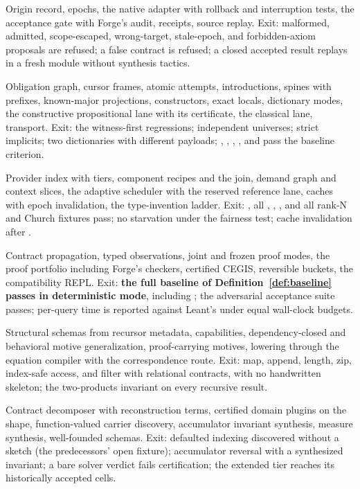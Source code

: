 \begin{description}[style=nextline]
\item[G0 Trusted path.] Origin record, epochs, the native adapter with rollback and interruption tests, the acceptance gate with Forge's audit, receipts, source replay. Exit: malformed, admitted, scope-escaped, wrong-target, stale-epoch, and forbidden-axiom proposals are refused; a false contract is refused; a closed accepted result replays in a fresh module without synthesis tactics.
\item[G1 Native core.] Obligation graph, cursor frames, atomic attempts, introductions, spines with prefixes, known-major projections, constructors, exact locals, dictionary modes, the constructive propositional lane with its certificate, the classical lane, transport. Exit: the witness-first regressions; independent universes; strict implicits; two dictionaries with different payloads; , , , , and  pass the baseline criterion.
\item[G2 Composition.] Provider index with tiers, component recipes and the join, demand graph and context slices, the adaptive scheduler with the reserved reference lane, caches with epoch invalidation, the type-invention ladder. Exit: , all , , , and all rank-N and Church fixtures pass; no starvation under the fairness test; cache invalidation after .
\item[G3 Baseline release.] Contract propagation, typed observations, joint and frozen proof modes, the proof portfolio including Forge's checkers, certified CEGIS, reversible buckets, the compatibility REPL. Exit: \textbf{the full baseline of Definition~\ref{def:baseline} passes in deterministic mode}, including ; the adversarial acceptance suite passes; per-query time is reported against Leant's under equal wall-clock budgets.
\item[G4 Dependent recursion.] Structural schemas from recursor metadata, capabilities, dependency-closed and behavioral motive generalization, proof-carrying motives, lowering through the equation compiler with the correspondence route. Exit: map, append, length, zip, index-safe access, and filter with relational contracts, with no handwritten skeleton; the two-products invariant on every recursive result.
\item[G5 Certified behavior and carriers.] Contract decomposer with reconstruction terms, certified domain plugins on the  shape, function-valued carrier discovery, accumulator invariant synthesis, measure synthesis, well-founded schemas. Exit: defaulted indexing discovered without a sketch (the predecessors' open fixture); accumulator reversal with a synthesized invariant; a bare solver verdict fails certification; the extended tier reaches its historically accepted cells.

\end{description}
